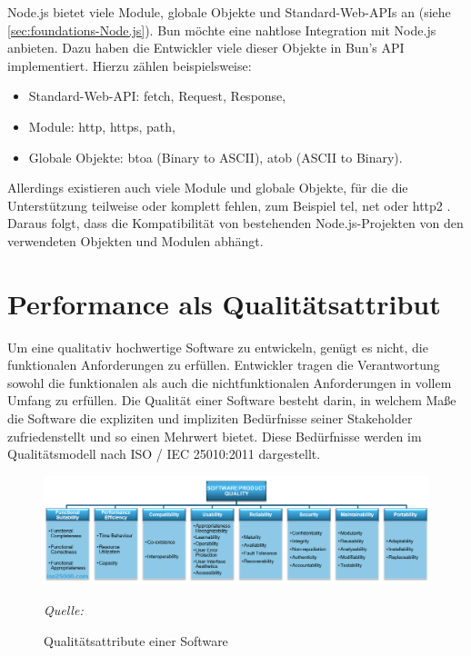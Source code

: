 \noindent
Node.js bietet viele Module, globale Objekte und Standard-Web-APIs an (siehe \autoref{sec:foundations-Node.js}). Bun möchte eine nahtlose Integration mit Node.js anbieten. Dazu haben die Entwickler viele dieser Objekte in Bun's API implementiert. Hierzu zählen beispielsweise:
\begin{itemize}
	\item Standard-Web-API: \glq fetch\grq{}, \glq Request\grq{}, \glq Response\grq{},
	\item Module: \glq http\grq{}, \glq https\grq{}, \glq path\grq{},
	\item Globale Objekte: \glq btoa\grq{} (Binary to ASCII), \glq atob\grq{} (ASCII to Binary).\cite{OvenSh.2023c}
\end{itemize} 

\noindent
Allerdings existieren auch viele Module und globale Objekte, für die die Unterstützung teilweise oder komplett fehlen, zum Beispiel \glq tel\grq{}, \glq net\grq{} oder \glq http2\grq{} \cite{OvenSh.2023c}. Daraus folgt, dass die Kompatibilität von bestehenden Node.js-Projekten von den verwendeten Objekten und Modulen abhängt.

\section{Performance als Qualitätsattribut} \label{sec:foundations-Performance}
Um eine qualitativ hochwertige Software zu entwickeln, genügt es nicht, die funktionalen Anforderungen zu erfüllen. Entwickler tragen die Verantwortung sowohl die funktionalen als auch die nichtfunktionalen Anforderungen in vollem Umfang zu erfüllen. Die Qualität einer Software besteht darin, in welchem Maße die Software die expliziten und impliziten Bedürfnisse seiner Stakeholder zufriedenstellt und so einen Mehrwert bietet. Diese Bedürfnisse werden im Qualitätsmodell nach ISO / IEC 25010:2011 dargestellt.\cite{.2022}\\

\begin{figure}[h]
	\centering
	\includegraphics[width=\linewidth]{./images/iso25010.png}
	\caption{Qualitätsattribute einer Software}
	\label{fig:softwareQuality}
	\textit{Quelle: \cite{.2022}}
\end{figure}

